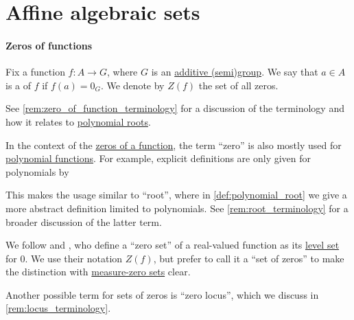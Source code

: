 \section{Affine algebraic sets}\label{sec:affine_algebraic_sets}

\paragraph{Zeros of functions}

\begin{definition}\label{def:zero_of_function}\mimprovised
  Fix a function \( f: A \to G \), where \( G \) is an \hyperref[def:additive_semigroup]{additive (semi)group}. We say that \( a \in A \) is a  of \( f \) if \( f(a) = 0_G \). We denote by \( Z(f) \) the set of all zeros.
\end{definition}
\begin{comments}
  \item See \cref{rem:zero_of_function_terminology} for a discussion of the terminology and how it relates to \hyperref[def:polynomial_root]{polynomial roots}.
\end{comments}

\begin{remark}\label{rem:zero_of_function_terminology}
  In the context of the \hyperref[def:zero_of_function]{zeros of a function}, the term \enquote{zero} is also mostly used for \hyperref[con:free_construction/evaluation]{polynomial functions}. For example, explicit definitions are only given for polynomials by
  \textcite[29]{Ahlfors1979ComplexAnalysis}
  \textcite[594]{Rotman2017AdvancedModernAlgebraPart2}
  \textcite[exerc. 1.68]{LidlNiederreiter1997FiniteFields}

  This makes the usage similar to \enquote{root}, where in \cref{def:polynomial_root} we give a more abstract definition limited to polynomials. See \cref{rem:root_terminology} for a broader discussion of the latter term.

  We follow \textcite[209]{Rudin1987RealAndComplexAnalysis} and \textcite[\S 1.10]{GillmanJerison1960RingsOfContinuousFunctions}, who define a \enquote{zero set} of a real-valued function as its \hyperref[def:level_set]{level set} for \( 0 \). We use their notation \( Z(f) \), but prefer to call it a \enquote{set of zeros} to make the distinction with \hyperref[con:measure_zero_set]{measure-zero sets} clear.

  Another possible term for sets of zeros is \enquote{zero locus}, which we discuss in \cref{rem:locus_terminology}.
\end{remark}

